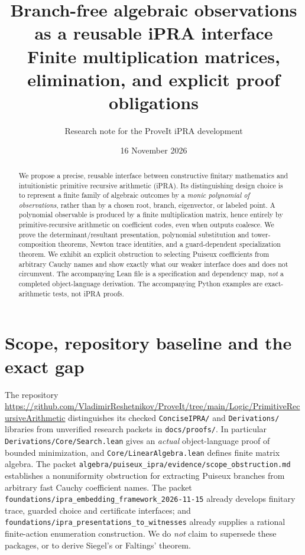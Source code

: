\documentclass[11pt]{article}
\title{Branch-free algebraic observations as a reusable iPRA interface\\\large Finite multiplication matrices, elimination, and explicit proof obligations}
\author{Research note for the ProveIt iPRA development}
\date{16 November 2026}
\begin{document}
\maketitle
\begin{abstract}
We propose a precise, reusable interface between constructive finitary mathematics and intuitionistic primitive recursive arithmetic (iPRA). Its distinguishing design choice is to represent a finite family of algebraic outcomes by a \emph{monic polynomial of observations}, rather than by a chosen root, branch, eigenvector, or labeled point. A polynomial observable is produced by a finite multiplication matrix, hence entirely by primitive-recursive arithmetic on coefficient codes, even when outputs coalesce. We prove the determinant/resultant presentation, polynomial substitution and tower-composition theorems, Newton trace identities, and a guard-dependent specialization theorem. We exhibit an explicit obstruction to selecting Puiseux coefficients from arbitrary Cauchy names and show exactly what our weaker interface does and does not circumvent. The accompanying Lean file is a specification and dependency map, \emph{not} a completed object-language derivation. The accompanying Python examples are exact-arithmetic tests, not iPRA proofs.
\end{abstract}
\tableofcontents

\section{Scope, repository baseline and the exact gap}
The repository \url{https://github.com/VladimirReshetnikov/ProveIt/tree/main/Logic/PrimitiveRecursiveArithmetic} distinguishes its checked \texttt{ConciseIPRA/} and \texttt{Derivations/} libraries from unverified research packets in \texttt{docs/proofs/}. In particular \texttt{Derivations/Core/Search.lean} gives an \emph{actual} object-language proof of bounded minimization, and \texttt{Core/LinearAlgebra.lean} defines finite matrix algebra. The packet \texttt{algebra/puiseux\_ipra/evidence/scope\_obstruction.md} establishes a nonuniformity obstruction for extracting Puiseux branches from arbitrary fast Cauchy coefficient names. The packet \texttt{foundations/ipra\_embedding\_framework\_2026-11-15} already develops finitary trace, guarded choice and certificate interfaces; and \texttt{foundations/ipra\_presentations\_to\_witnesses} already supplies a rational finite-action enumeration construction. We do \emph{not} claim to supersede these packages, or to derive Siegel's or Faltings' theorem.
\end{document}
